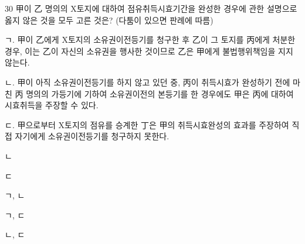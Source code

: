 \begin{question}{30}
甲이 乙 명의의 X토지에 대하여 점유취득시효기간을 완성한 경우에 관한 설명으로 옳지 않은 것을 모두 고른 것은? (다툼이 있으면 판례에 따름)
\begin{framedtext}
ㄱ. 甲이 乙에게 X토지의 소유권이전등기를 청구한 후 乙이 그 토지를 丙에게 처분한 경우, 이는 乙이 자신의 소유권을 행사한 것이므로 乙은 甲에게 불법행위책임을 지지 않는다. \par
ㄴ. 甲이 아직 소유권이전등기를 하지 않고 있던 중, 丙이 취득시효가 완성하기 전에 마친 丙 명의의 가등기에 기하여 소유권이전의 본등기를 한 경우에도 甲은 丙에 대하여 시효취득을 주장할 수 있다. \par
ㄷ. 甲으로부터 X토지의 점유를 승계한 丁은 甲의 취득시효완성의 효과를 주장하여 직접 자기에게 소유권이전등기를 청구하지 못한다. \par
\end{framedtext}
\begin{choices}
  \item ㄴ
  \item ㄷ
  \item ㄱ, ㄴ
  \item ㄱ, ㄷ
  \item ㄴ, ㄷ
\end{choices}
\end{question}
